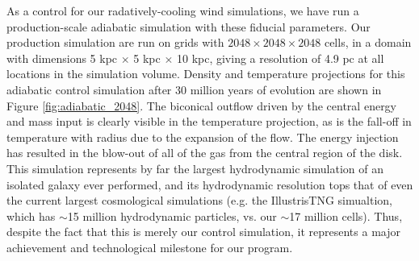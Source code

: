\documentclass[11pt,letterpaper,english]{article}
\begin{document}
As a control for our radatively-cooling wind simulations, we have run a production-scale adiabatic simulation with these fiducial parameters. Our production simulation are run on grids with $2048\times2048\times2048$ cells, in a domain with dimensions 5 kpc $\times$ 5 kpc $\times$ 10 kpc, giving a resolution of 4.9 pc at all locations in the simulation volume. Density and temperature projections for this adiabatic control simulation after 30 million years of evolution are shown in Figure \ref{fig:adiabatic_2048}. The biconical outflow driven by the central energy and mass input is clearly visible in the temperature projection, as is the fall-off in temperature with radius due to the expansion of the flow. The energy injection has resulted in the blow-out of all of the gas from the central region of the disk. This simulation represents by far the largest hydrodynamic simulation of an isolated galaxy ever performed, and its hydrodynamic resolution tops that of even the current largest cosmological simulations (e.g. the IllustrisTNG simualtion, which has $\sim$15 million hydrodynamic particles, vs. our $\sim$17 million cells). Thus, despite the fact that this is merely our control simulation, it represents a major achievement and technological milestone for our program.
\end{document}
